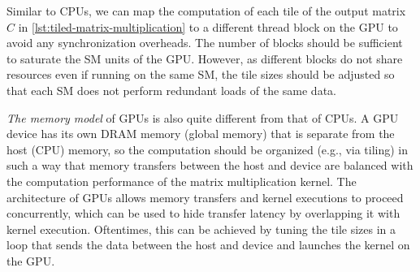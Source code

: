 Similar to CPUs, we can map the computation of each tile of the output matrix $C$ in \cref{lst:tiled-matrix-multiplication} to a different thread block on the GPU to avoid any synchronization overheads. The number of blocks should be sufficient to saturate the SM units of the GPU\@. However, as different blocks do not share resources even if running on the same SM\@, the tile sizes should be adjusted so that each SM does not perform redundant loads of the same data.


\emph{The memory model} of GPUs is also quite different from that of CPUs. A GPU device has its own DRAM memory (global memory) that is separate from the host (CPU) memory, so the computation should be organized (e.g., via tiling) in such a way that memory transfers between the host and device are balanced with the computation performance of the matrix multiplication kernel. The architecture of GPUs allows memory transfers and kernel executions to proceed concurrently, which can be used to hide transfer latency by overlapping it with kernel execution. Oftentimes, this can be achieved by tuning the tile sizes in a loop that sends the data between the host and device and launches the kernel on the GPU\@.

